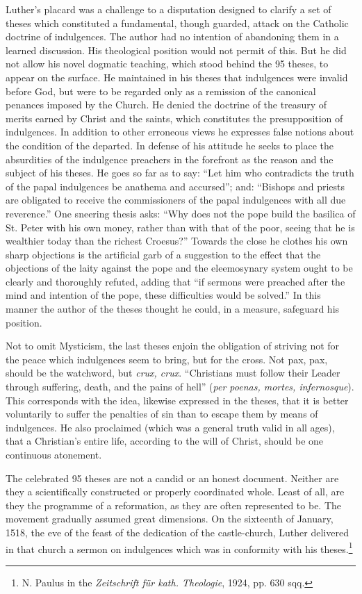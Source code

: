Luther’s placard was a challenge to a disputation designed to clarify a
set of theses which constituted a fundamental, though guarded,
attack on the Catholic doctrine of indulgences. The author had no
intention of abandoning them in a learned discussion. His theological
position would not permit of this. But he did not allow his novel
dogmatic teaching, which stood behind the 95 theses, to appear on
the surface. He maintained in his theses that indulgences were invalid
before God, but were to be regarded only as a remission of the
canonical penances imposed by the Church. He denied the doctrine
of the treasury of merits earned by Christ and the saints, which
constitutes the presupposition of indulgences. In addition to other
erroneous views he expresses false notions about the condition of the
departed. In defense of his attitude he seeks to place the absurdities
of the indulgence preachers in the forefront as the reason and the subject of
his theses. He goes so far as to say: “Let him who contradicts
the truth of the papal indulgences be anathema and accursed”; and:
“Bishops and priests are obligated to receive the commissioners of
the papal indulgences with all due reverence.” One sneering thesis
asks: “Why does not the pope build the basilica of St. Peter with his
own money, rather than with that of the poor, seeing that he is
wealthier today than the richest Croesus?” Towards the close he
clothes his own sharp objections is the artificial garb of a suggestion
to the effect that the objections of the laity against the pope and the
eleemosynary system ought to be clearly and thoroughly refuted,
adding that “if sermons were preached after the mind and intention
of the pope, these difficulties would be solved.” In this manner the
author of the theses thought he could, in a measure, safeguard his
position.

Not to omit Mysticism, the last theses enjoin the obligation of
striving not for the peace which indulgences seem to bring, but for
the cross. Not pax, pax, should be the watchword, but \textit{crux, crux}.
“Christians must follow their Leader through suffering, death, and
the pains of hell” (\textit{per poenas, mortes, infernosque}). This corresponds
with the idea, likewise expressed in the theses, that it is better voluntarily
to suffer the penalties of sin than to escape them by means of indulgences.
He also proclaimed (which was a general truth valid in
all ages), that a Christian’s entire life, according to the will of Christ,
should be one continuous atonement.

The celebrated 95 theses are not a candid or an honest document.
Neither are they a scientifically constructed or properly coordinated
whole. Least of all, are they the programme of a reformation, as they
are often represented to be.
The movement gradually assumed great dimensions. On the sixteenth
of January, 1518, the eve of the feast of the dedication of the
castle-church, Luther delivered in that church a sermon on indulgences
which was in conformity with his theses.\footnote
{N. Paulus in the \textit{Zeitschrift für kath. Theologie}, 1924, pp. 630 sqq.}

